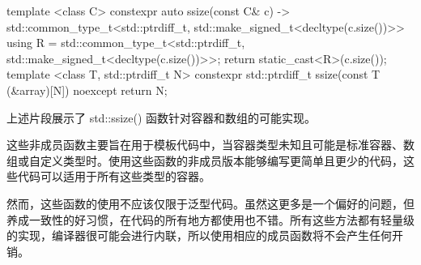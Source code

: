\begin{cpp}
template <class C>
constexpr auto ssize(const C& c)
    -> std::common_type_t<std::ptrdiff_t,
                          std::make_signed_t<decltype(c.size())>>
{
    using R = std::common_type_t<std::ptrdiff_t,
                        std::make_signed_t<decltype(c.size())>>;
    return static_cast<R>(c.size());
}
template <class T, std::ptrdiff_t N>
constexpr std::ptrdiff_t ssize(const T (&array)[N]) noexcept
{
    return N;
}
\end{cpp}

上述片段展示了 std::ssize() 函数针对容器和数组的可能实现。


这些非成员函数主要旨在用于模板代码中，当容器类型未知且可能是标准容器、数组或自定义类型时。使用这些函数的非成员版本能够编写更简单且更少的代码，这些代码可以适用于所有这些类型的容器。

然而，这些函数的使用不应该仅限于泛型代码。虽然这更多是一个偏好的问题，但养成一致性的好习惯，在代码的所有地方都使用也不错。所有这些方法都有轻量级的实现，编译器很可能会进行内联，所以使用相应的成员函数将不会产生任何开销。

